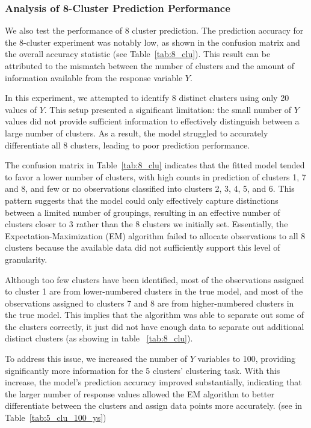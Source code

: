 \documentclass{article}
\begin{document}
\clearpage

\subsubsection{Analysis of 8-Cluster Prediction Performance}

We also test the performance of 8 cluster prediction.
The prediction accuracy for the 8-cluster experiment was notably low, as shown in the confusion matrix and the overall accuracy statistic (see Table~\ref{tab:8_clu}). This result can be attributed to the mismatch between the number of clusters and the amount of information available from the response variable \(Y\).

In this experiment, we attempted to identify 8 distinct clusters using only 20 values of \(Y\). This setup presented a significant limitation: the small number of \(Y\) values did not provide sufficient information to effectively distinguish between a large number of clusters. As a result, the model struggled to accurately differentiate all 8 clusters, leading to poor prediction performance.

The confusion matrix in Table~\ref{tab:8_clu} indicates that the fitted model tended to favor a lower number of clusters, with high counts in prediction of clusters 1, 7 and 8, and few or no observations classified into clusters 2, 3, 4, 5, and 6. This pattern suggests that the model could only effectively capture distinctions between a limited number of groupings, resulting in an effective number of clusters closer to 3 rather than the 8 clusters we initially set. Essentially, the Expectation-Maximization (EM) algorithm failed to allocate observations to all 8 clusters because the available data did not sufficiently support this level of granularity.

Although too few clusters have been identified, most of the observations assigned to cluster 1 are from lower-numbered clusters in the true model, and most of the observations assigned to clusters 7 and 8 are from higher-numbered clusters in the true model. This implies that the algorithm was able to separate out some of the clusters correctly, it just did not have enough data to separate out additional distinct clusters (as showing in table ~\ref{tab:8_clu}).

To address this issue, we increased the number of \(Y\) variables to 100, providing significantly more information for the 5 clusters' clustering task. 
With this increase, the model's prediction accuracy improved substantially, indicating that the larger number of response values allowed the EM algorithm to better differentiate between the clusters and assign data points more accurately. (see in Table~\ref{tab:5_clu_100_ys})
\end{document}
